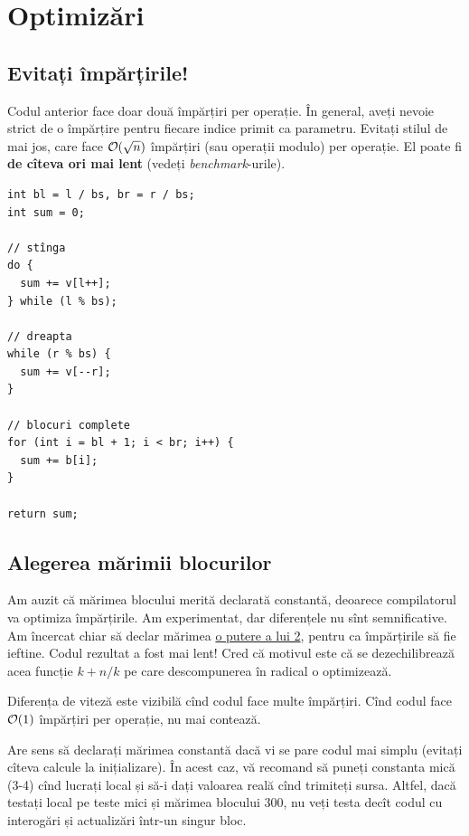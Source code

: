 \documentclass[../main.tex]{subfiles}
\begin{document}
\section{Optimizări}

\subsection{Evitați împărțirile!}

Codul anterior face doar două împărțiri per operație. În general, aveți nevoie strict de o împărțire pentru fiecare indice primit ca parametru. Evitați stilul de mai jos, care face $\mathcal{O}(\sqrt{n})$ împărțiri (sau operații modulo) per operație. El poate fi \textbf{de cîteva ori mai lent} (vedeți \textit{benchmark}-urile).

\begin{verbatim}
int bl = l / bs, br = r / bs;
int sum = 0;

// stînga
do {
  sum += v[l++];
} while (l % bs);

// dreapta
while (r % bs) {
  sum += v[--r];
}

// blocuri complete
for (int i = bl + 1; i < br; i++) {
  sum += b[i];
}

return sum;
\end{verbatim}

\subsection{Alegerea mărimii blocurilor}

Am auzit că mărimea blocului merită declarată constantă, deoarece compilatorul va optimiza împărțirile. Am experimentat, dar diferențele nu sînt semnificative. Am încercat chiar să declar mărimea \href{https://github.com/CatalinFrancu/nerdvana/blob/main/query-update/point-range/sqrt-pow2.cpp}{o putere a lui 2}, pentru ca împărțirile să fie ieftine. Codul rezultat a fost mai lent! Cred că motivul este că se dezechilibrează acea funcție $k + n/k$ pe care descompunerea în radical o optimizează.

Diferența de viteză este vizibilă cînd codul face multe împărțiri. Cînd codul face $\mathcal{O}(1)$ împărțiri per operație, nu mai contează.

Are sens să declarați mărimea constantă dacă vi se pare codul mai simplu (evitați cîteva calcule la inițializare). În acest caz, vă recomand să puneți constanta mică (3-4) cînd lucrați local și să-i dați valoarea reală cînd trimiteți sursa. Altfel, dacă testați local pe teste mici și mărimea blocului 300, nu veți testa decît codul cu interogări și actualizări într-un singur bloc.
\end{document}
